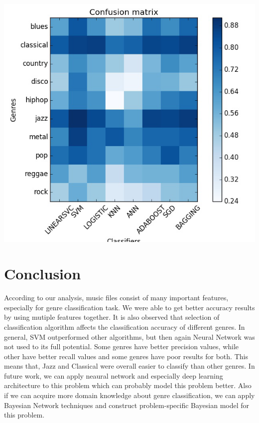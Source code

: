 \documentclass[conference]{IEEEtran}
\begin{document}
\includegraphics[width=\columnwidth]{f1score}

\section{Conclusion}
According to our analysis, music files consist of many important features, especially for genre classification task. We were able to get better accuracy results by using mutiple features together. It is also observed that selection of classification algorithm affects the classification accuracy of different genres. In general, SVM outperformed other algorithms, but then again Neural Network was not used to its full potential. Some genres have better precision values, while other have better recall values and some genres have poor results for both. This means that, Jazz and Classical were overall easier to classify than other genres. In future work, we can apply neaural network and especially deep learning architecture to this problem which can probably model this problem better. Also if we can acquire more domain knowledge about genre classification, we can apply Bayesian Network techniques and construct problem-specific Bayesian model for this problem.



\end{document}
